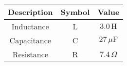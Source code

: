 \begin{tabular}{c|c|c}
    \hline
    Description & Symbol & Value\\
    \hline
     Inductance & L &  $3.0\, \text{H}$\\
     Capacitance & C &  $27\, \mu\text{F}$\\
     Resistance & R &  $7.4\, \Omega$\\
    \hline
\end{tabular}

